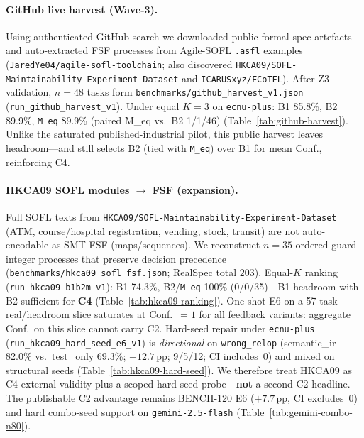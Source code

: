 

\paragraph{GitHub live harvest (Wave-3).}
Using authenticated GitHub search we downloaded public formal-spec artefacts
and auto-extracted FSF processes from Agile-SOFL \texttt{.asfl} examples
(\texttt{JaredYe04/agile-sofl-toolchain}; also discovered
\texttt{HKCA09/SOFL-Maintainability-Experiment-Dataset} and
\texttt{ICARUSxyz/FCoTFL}).
After Z3 validation, $n{=}48$ tasks form
\texttt{benchmarks/github\_harvest\_v1.json}
(\texttt{run\_github\_harvest\_v1}).
Under equal $K{=}3$ on \texttt{ecnu-plus}: B1 85.8\%, B2 89.9\%,
\texttt{M\_eq} 89.9\% (paired M\_eq vs.\ B2 1/1/46)
(Table~\ref{tab:github-harvest}).
Unlike the saturated published-industrial pilot, this public harvest leaves
headroom---and still selects B2 (tied with \texttt{M\_eq}) over B1 for mean
Conf., reinforcing C4.



\paragraph{HKCA09 SOFL modules $\rightarrow$ FSF (expansion).}
Full SOFL texts from
\texttt{HKCA09/SOFL-Maintainability-Experiment-Dataset}
(ATM, course/hospital registration, vending, stock, transit) are not
auto-encodable as SMT FSF (maps/sequences).
We reconstruct $n{=}35$ ordered-guard integer processes that preserve
decision precedence
(\texttt{benchmarks/hkca09\_sofl\_fsf.json}; RealSpec total $203$).
Equal-$K$ ranking (\texttt{run\_hkca09\_b1b2m\_v1}): B1 74.3\%,
B2/\texttt{M\_eq} 100\% (0/0/35)---B1 headroom with B2 sufficient for
\textbf{C4} (Table~\ref{tab:hkca09-ranking}).
One-shot E6 on a 57-task real/headroom slice saturates at Conf.\ $=1$ for
all feedback variants: aggregate Conf.\ on this slice cannot carry C2.
Hard-seed repair under \texttt{ecnu-plus}
(\texttt{run\_hkca09\_hard\_seed\_e6\_v1}) is \emph{directional} on
\texttt{wrong\_relop} (semantic\_ir 82.0\% vs.\ test\_only 69.3\%;
${+}12.7$\,pp; 9/5/12; CI includes~0) and mixed on structural seeds
(Table~\ref{tab:hkca09-hard-seed}).
We therefore treat HKCA09 as C4 external validity plus a scoped hard-seed
probe---\textbf{not} a second C2 headline.
The publishable C2 advantage remains BENCH-120 E6 (${+}7.7$\,pp, CI
excludes~0) and hard combo-seed support on \texttt{gemini-2.5-flash}
(Table~\ref{tab:gemini-combo-n80}).

